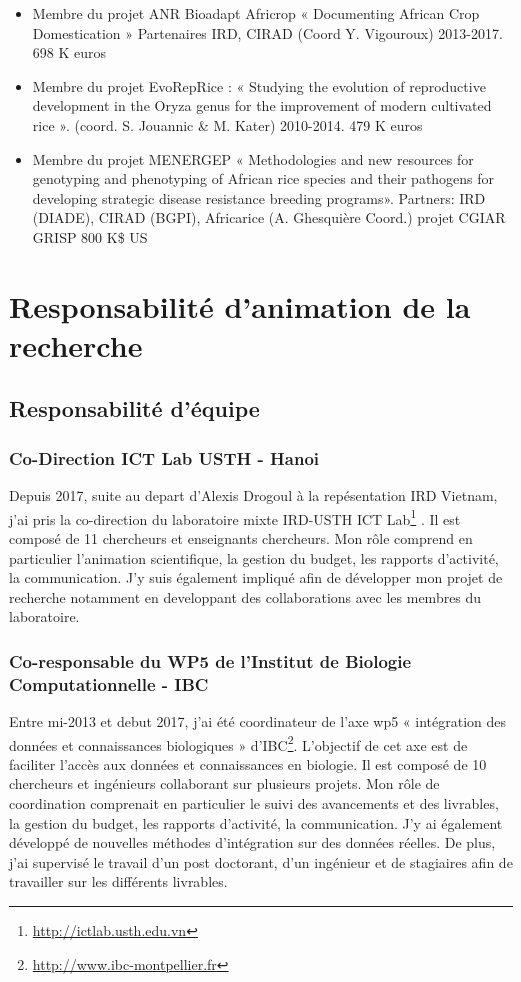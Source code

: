 \begin{itemize}
\item Membre du projet ANR Bioadapt Africrop  « Documenting African Crop Domestication » Partenaires IRD, CIRAD (Coord Y. Vigouroux) 2013-2017. 698 K euros
\item Membre du projet EvoRepRice : « Studying the evolution of reproductive development in the Oryza genus for the improvement of modern cultivated rice ». (coord.  S. Jouannic \& M. Kater) 2010-2014.  479 K euros
\item Membre du projet MENERGEP « Methodologies and new resources for genotyping and phenotyping of African rice species and their pathogens for developing strategic disease resistance breeding programs». Partners: IRD (DIADE), CIRAD (BGPI), Africarice (A. Ghesquière Coord.) projet CGIAR GRISP 800 K\$ US
\end{itemize}

\section{Responsabilité d'animation de la recherche}

\subsection*{Responsabilité d’équipe}
\subsubsection*{Co-Direction ICT Lab USTH - Hanoi} 
Depuis 2017, suite au depart d’Alexis Drogoul à la repésentation IRD Vietnam, j’ai pris la co-direction du laboratoire mixte IRD-USTH ICT Lab\footnote{\url{http://ictlab.usth.edu.vn}} . Il est composé de 11 chercheurs et enseignants chercheurs. Mon rôle comprend en particulier l’animation scientifique, la gestion du budget, les rapports d’activité, la communication. J’y suis également impliqué afin de développer mon projet de recherche notamment en developpant des collaborations avec les membres du laboratoire. 

\subsubsection*{Co-responsable du WP5 de l’Institut de Biologie Computationnelle - IBC} 
Entre mi-2013 et debut 2017, j’ai été coordinateur de l’axe wp5 « intégration des données et connaissances biologiques » d'IBC\footnote{\url{http://www.ibc-montpellier.fr}}. L’objectif de cet axe est de faciliter l’accès aux données et connaissances en biologie. Il est composé de 10 chercheurs et ingénieurs collaborant sur plusieurs projets. Mon rôle de coordination comprenait en particulier le suivi des avancements et des livrables, la gestion du budget, les rapports d’activité, la communication. J’y ai également développé de nouvelles méthodes d’intégration sur des données réelles. De plus, j’ai supervisé le travail d’un post doctorant, d’un ingénieur et de stagiaires afin de travailler sur les différents livrables.  


